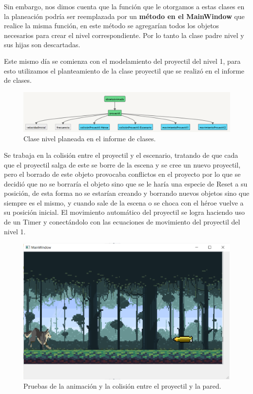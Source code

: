 \documentclass{article}
\begin{document}
Sin embargo, nos dimos cuenta que la función que le otorgamos a estas clases en la planeación podría ser reemplazada por un \textbf{método en el MainWindow} que realice la misma función, en este método se agregarían todos los objetos necesarios para crear el nivel correspondiente. Por lo tanto la clase padre nivel y sus hijas son descartadas.

Este mismo día se comienza con el modelamiento del proyectil del nivel 1, para esto utilizamos el planteamiento de la clase proyectil que se realizó en el informe de clases.

\begin{figure}[h]
\includegraphics[scale=0.5]{Images/proyectil.png}
\centering
\caption{Clase nivel planeada en el informe de clases.}
\label{fig:proyectil}
\end{figure}

Se trabaja en la colisión entre el proyectil y el escenario, tratando de que cada que el proyectil salga de este se borre de la escena y se cree un nuevo proyectil, pero el borrado de este objeto provocaba conflictos en el proyecto por lo que se decidió que no se borraría el objeto sino que se le haría una especie de Reset a su posición, de esta forma no se estarían creando y borrando nuevos objetos sino que siempre es el mismo, y cuando sale de la escena o se choca con el héroe vuelve a su posición inicial.
El movimiento automático del proyectil se logra haciendo uso de un Timer y conectándolo con las ecuaciones de movimiento del proyectil del nivel 1.

\begin{figure}[h]
\includegraphics[scale=0.55]{Images/proyectil1.png}
\centering
\caption{Pruebas de la animación y la colisión entre el proyectil y la pared.}
\label{fig:proyectil1}
\end{figure}
\end{document}
